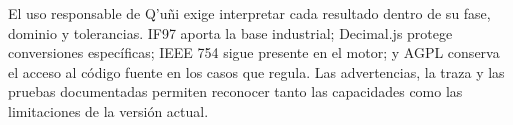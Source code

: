 \documentclass[11pt,a4paper,oneside]{article}
\newcommand{\app}{Q'u\~ni}
\begin{document}
El uso responsable de \app{} exige interpretar cada resultado dentro de su fase, dominio y tolerancias. IF97 aporta la base industrial; Decimal.js protege conversiones espec\'ificas; IEEE 754 sigue presente en el motor; y AGPL conserva el acceso al c\'odigo fuente en los casos que regula. Las advertencias, la traza y las pruebas documentadas permiten reconocer tanto las capacidades como las limitaciones de la versi\'on actual.

\clearpage


\end{document}
